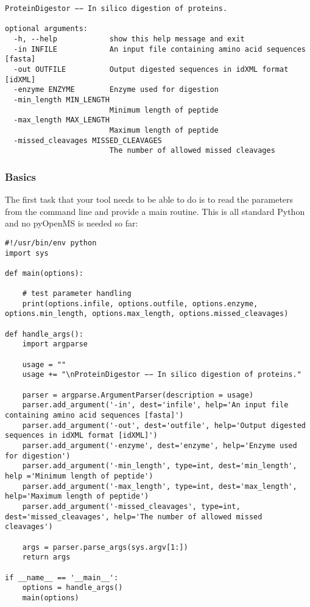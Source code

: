 {\begin{lstlisting}
ProteinDigestor −− In silico digestion of proteins.

optional arguments:
  -h, --help            show this help message and exit
  -in INFILE            An input file containing amino acid sequences [fasta]
  -out OUTFILE          Output digested sequences in idXML format [idXML]
  -enzyme ENZYME        Enzyme used for digestion
  -min_length MIN_LENGTH
                        Minimum length of peptide
  -max_length MAX_LENGTH
                        Maximum length of peptide
  -missed_cleavages MISSED_CLEAVAGES
                        The number of allowed missed cleavages
\end{lstlisting}

\subsubsection{Basics}
The first task that your tool needs to be able to do is to read the parameters from the command line and provide a main routine. This is all standard Python and no pyOpenMS is needed so far:

\begin{lstlisting}
#!/usr/bin/env python
import sys

def main(options):

    # test parameter handling
    print(options.infile, options.outfile, options.enzyme, options.min_length, options.max_length, options.missed_cleavages)

def handle_args():
    import argparse

    usage = ""
    usage += "\nProteinDigestor −− In silico digestion of proteins."

    parser = argparse.ArgumentParser(description = usage)
    parser.add_argument('-in', dest='infile', help='An input file containing amino acid sequences [fasta]')
    parser.add_argument('-out', dest='outfile', help='Output digested sequences in idXML format [idXML]')
    parser.add_argument('-enzyme', dest='enzyme', help='Enzyme used for digestion')
    parser.add_argument('-min_length', type=int, dest='min_length', help ='Minimum length of peptide')
    parser.add_argument('-max_length', type=int, dest='max_length', help='Maximum length of peptide')
    parser.add_argument('-missed_cleavages', type=int, dest='missed_cleavages', help='The number of allowed missed cleavages')

    args = parser.parse_args(sys.argv[1:])
    return args

if __name__ == '__main__':
    options = handle_args()
    main(options)
\end{lstlisting}

}
